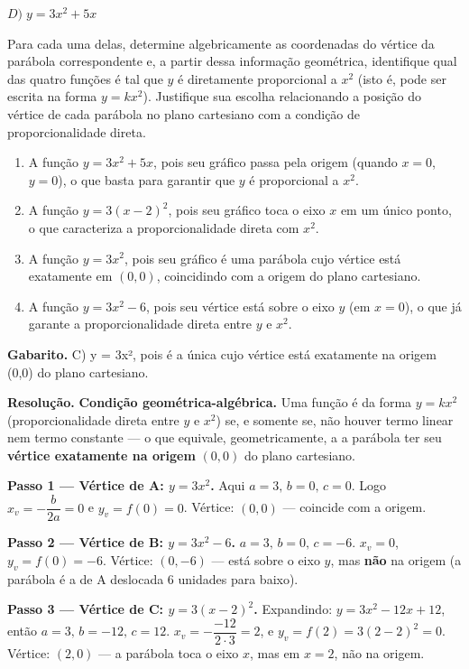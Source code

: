 \documentclass[11pt,a4paper]{article}
\begin{document}
$D) \; y = 3x^2 + 5x$

Para cada uma delas, determine algebricamente as coordenadas do vértice da parábola correspondente e, a partir dessa informação geométrica, identifique qual das quatro funções é tal que $y$ é diretamente proporcional a $x^2$ (isto é, pode ser escrita na forma $y = kx^2$). Justifique sua escolha relacionando a posição do vértice de cada parábola no plano cartesiano com a condição de proporcionalidade direta.
\begin{enumerate}[label=(\alph*)]
\item A função $y = 3x^2 + 5x$, pois seu gráfico passa pela origem (quando $x=0$, $y=0$), o que basta para garantir que $y$ é proporcional a $x^2$.
\item A função $y = 3(x-2)^2$, pois seu gráfico toca o eixo $x$ em um único ponto, o que caracteriza a proporcionalidade direta com $x^2$.
\item A função $y = 3x^2$, pois seu gráfico é uma parábola cujo vértice está exatamente em $(0,0)$, coincidindo com a origem do plano cartesiano.
\item A função $y = 3x^2 - 6$, pois seu vértice está sobre o eixo $y$ (em $x=0$), o que já garante a proporcionalidade direta entre $y$ e $x^2$.
\end{enumerate}

\textbf{Gabarito.} C) y = 3x², pois é a única cujo vértice está exatamente na origem (0,0) do plano cartesiano.

\textbf{Resolução.} \textbf{Condição geométrica-algébrica.} Uma função é da forma $y = kx^2$ (proporcionalidade direta entre $y$ e $x^2$) se, e somente se, não houver termo linear nem termo constante — o que equivale, geometricamente, a a parábola ter seu \textbf{vértice exatamente na origem} $(0,0)$ do plano cartesiano.

\textbf{Passo 1 — Vértice de A: $y=3x^2$.}
Aqui $a=3,\,b=0,\,c=0$. Logo $x_v = -\dfrac{b}{2a} = 0$ e $y_v = f(0) = 0$.
Vértice: $(0,0)$ — coincide com a origem.

\textbf{Passo 2 — Vértice de B: $y=3x^2-6$.}
$a=3,\,b=0,\,c=-6$. $x_v = 0$, $y_v = f(0) = -6$.
Vértice: $(0,-6)$ — está sobre o eixo $y$, mas \textbf{não} na origem (a parábola é a de A deslocada 6 unidades para baixo).

\textbf{Passo 3 — Vértice de C: $y=3(x-2)^2$.}
Expandindo: $y = 3x^2 - 12x + 12$, então $a=3,\,b=-12,\,c=12$.
$x_v = -\dfrac{-12}{2\cdot 3} = 2$, e $y_v = f(2) = 3(2-2)^2 = 0$.
Vértice: $(2,0)$ — a parábola toca o eixo $x$, mas em $x=2$, não na origem.
\end{document}
